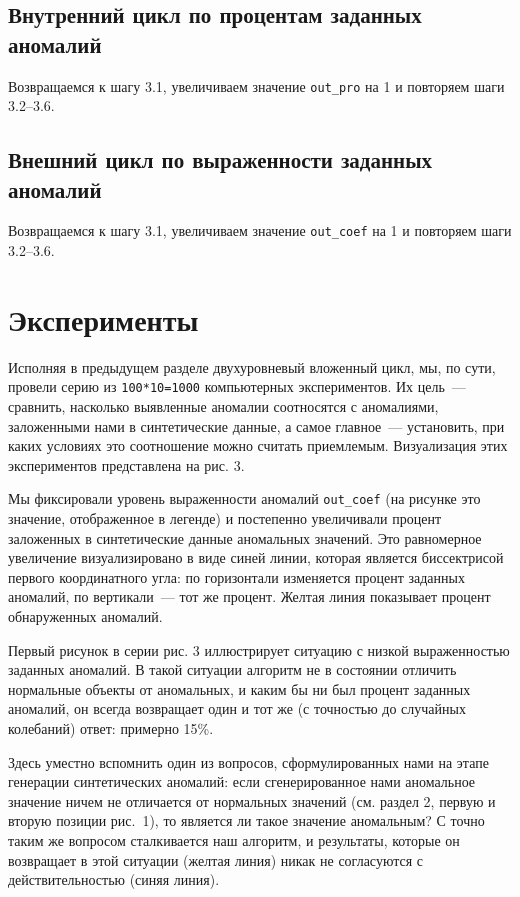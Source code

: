 \documentclass[a4paper,12pt]{article}
\begin{document}
\subsection{Внутренний цикл по процентам заданных аномалий}

Возвращаемся к шагу 3.1, увеличиваем значение \texttt{out\_pro} на 1 и повторяем шаги 3.2–3.6.

\subsection{Внешний цикл по выраженности заданных аномалий}

Возвращаемся к шагу 3.1, увеличиваем значение \texttt{out\_coef} на 1 и повторяем шаги 3.2–3.6.


\section{Эксперименты}

Исполняя в предыдущем разделе двухуровневый вложенный цикл, мы, по сути, провели серию из \texttt{100*10=1000} компьютерных экспериментов. Их цель — сравнить, насколько выявленные аномалии соотносятся с аномалиями, заложенными нами в синтетические данные, а самое главное — установить, при каких условиях это соотношение можно считать приемлемым. Визуализация этих экспериментов представлена на рис. 3.

Мы фиксировали уровень выраженности аномалий \texttt{out\_coef} (на рисунке это значение, отображенное в легенде) и постепенно увеличивали процент заложенных в синтетические данные аномальных значений. Это равномерное увеличение визуализировано в виде синей линии, которая является биссектрисой первого координатного угла: по горизонтали изменяется процент заданных аномалий, по вертикали — тот же процент. Желтая линия показывает процент обнаруженных аномалий.

Первый рисунок в серии рис. 3 иллюстрирует ситуацию с низкой выраженностью заданных аномалий. В такой ситуации алгоритм не в состоянии отличить нормальные объекты от аномальных, и каким бы ни был процент заданных аномалий, он всегда возвращает один и тот же (с точностью до случайных колебаний) ответ: примерно 15\%. 

Здесь уместно вспомнить один из вопросов, сформулированных нами на этапе генерации синтетических аномалий: если сгенерированное нами аномальное значение ничем не отличается от нормальных значений (см. раздел 2, первую и вторую позиции рис. 1), то является ли такое значение аномальным? С точно таким же вопросом сталкивается наш алгоритм, и результаты, которые он возвращает в этой ситуации (желтая линия) никак не согласуются с действительностью (синяя линия).
\end{document}
